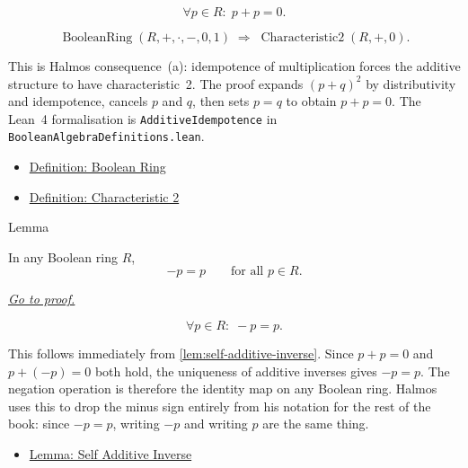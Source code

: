 \begin{remark*}
\[
\forall p \in R{:}\; p + p = 0.
\]
\end{remark*}

\begin{remark*}
\[
\operatorname{BooleanRing}(R,+,\cdot,-,0,1)
\;\Longrightarrow\;
\operatorname{Characteristic2}(R,+,0).
\]
\end{remark*}

\begin{remark*}[Interpretation]
This is Halmos consequence~(a): idempotence of multiplication
forces the additive structure to have characteristic~2.  The proof
expands $(p+q)^2$ by distributivity and idempotence, cancels $p$
and $q$, then sets $p = q$ to obtain $p + p = 0$.  The Lean~4
formalisation is \texttt{AdditiveIdempotence} in
\texttt{BooleanAlgebraDefinitions.lean}.
\end{remark*}

\begin{remark*}[Dependencies]
\begin{itemize}
  \item \hyperref[def:boolean-ring]{Definition: Boolean Ring}
  \item \hyperref[def:characteristic-2]{Definition: Characteristic 2}
\end{itemize}
\end{remark*}


\begin{lemmabox}{Lemma}
\begin{lemma}
\label{lem:self-negation}
In any Boolean ring $R$,
\[
-p = p \qquad \text{for all } p \in R.
\]

\smallskip
\noindent
\hyperref[prf:self-negation]{\textit{Go to proof.}}
\end{lemma}
\end{lemmabox}

\begin{remark*}
\[
\forall p \in R{:}\; -p = p.
\]
\end{remark*}

\begin{remark*}[Interpretation]
This follows immediately from \ref{lem:self-additive-inverse}.
Since $p + p = 0$ and $p + (-p) = 0$ both hold, the uniqueness of
additive inverses gives $-p = p$.  The negation operation is
therefore the identity map on any Boolean ring.  Halmos uses this
to drop the minus sign entirely from his notation for the rest of
the book: since $-p = p$, writing $-p$ and writing $p$ are the
same thing.
\end{remark*}

\begin{remark*}[Dependencies]
\begin{itemize}
  \item \hyperref[lem:self-additive-inverse]{Lemma: Self Additive Inverse}
\end{itemize}
\end{remark*}
